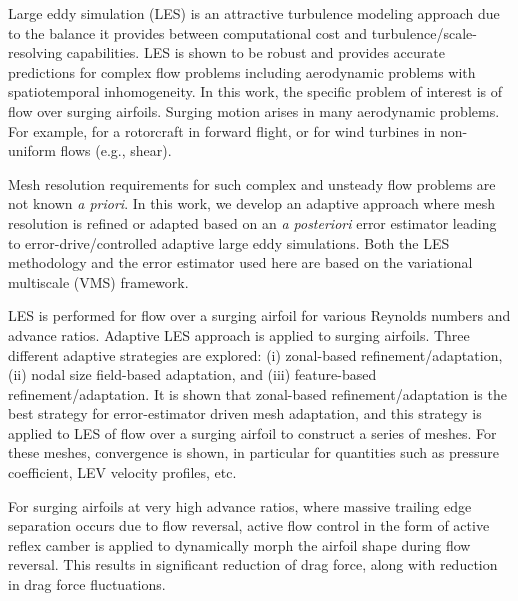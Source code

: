  
 
Large eddy simulation (LES) is an attractive turbulence modeling approach due to the balance it provides between computational cost and turbulence/scale-resolving capabilities. 
LES is shown to be robust and provides accurate predictions for complex flow problems including aerodynamic problems with spatiotemporal inhomogeneity.
In this work, the specific problem of interest is of flow over surging airfoils.
Surging motion arises in many aerodynamic problems. For example, for a rotorcraft in forward flight, or for wind turbines in non-uniform flows (e.g., shear).


Mesh resolution requirements for such complex and unsteady flow problems are not known \textit{a priori}.
In this work, we develop an adaptive approach where mesh resolution is refined or adapted based on an \textit{a posteriori} error estimator leading to error-drive/controlled adaptive large eddy simulations.
Both the LES methodology and the error estimator used here are based on the variational multiscale (VMS) framework.

LES is performed for flow over a surging airfoil for various Reynolds numbers and advance ratios.
Adaptive LES approach is applied to surging airfoils.
Three different adaptive strategies are explored: (i) zonal-based refinement/adaptation, (ii) nodal size field-based adaptation, and (iii) feature-based refinement/adaptation.
It is shown that zonal-based refinement/adaptation is the best strategy for error-estimator driven mesh adaptation, and this strategy is applied to LES of flow over a surging airfoil to construct a series of meshes. For these meshes, convergence is shown, in particular for quantities such as pressure coefficient, LEV velocity profiles, etc.



For surging airfoils at very high advance ratios, where massive trailing edge separation occurs due to flow reversal, active flow control in the form of active reflex camber is applied to dynamically morph the airfoil shape during flow reversal. This results in significant reduction of drag force, along with reduction in drag force fluctuations.



